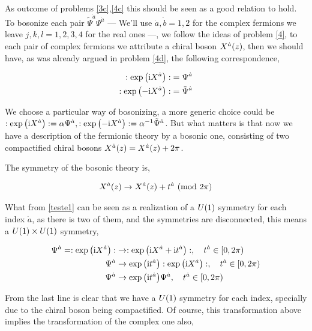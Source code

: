 As outcome of problems \ref{3c},\ref{4c} this should be seen as a good relation to hold. To bosonize each pair ${\tilde\Psi}^{\dot a}\Psi^{\dot a}$ --- We'll use $\dot a,\dot b=1,2$ for the complex fermions we 
leave $j,k,l=1,2,3,4$ for the real ones ---, 
we follow the ideas of problem \ref{4}, to each pair of complex fermions we attribute a chiral boson $X^{\dot a}\qty(z)$, then 
we should have, as was already argued in problem \ref{4d}, the following correspondence,

\begin{subequations}\label{teste1}
\begin{align}
    :\exp\qty(\textnormal{i} X^{\dot a}):&= \Psi^{\dot a}\\
    :\exp\qty(-\textnormal{i} X^{\dot a}):&= {\tilde\Psi}^{\dot a}
\end{align}
\end{subequations}

We choose a particular way of bosonizing, a more generic choice could be $:\exp\qty(\textnormal{i} X^{\dot a}):=\alpha \Psi^{\dot a},:\exp\qty(-\textnormal{i} X^{\dot a}):=\alpha^{-1} {\tilde\Psi}^{\dot a}$. 
But what matters is that now we have a description of the fermionic theory by a bosonic one, consisting of two compactified chiral bosons $X^{\dot a}\qty(z)=X^{\dot a}\qty(z)+2\pi$. 

\probitem{}

The symmetry of the bosonic theory is,

\begin{align*}
    X^{\dot a}\qty(z)\rightarrow X^{\dot a}\qty(z)+t^{\dot a}\ \qty(\textnormal{mod }2\pi)
\end{align*}

What from \ref{teste1} can be seen as a realization of a $U\qty(1)$ symmetry for each index $\dot a$, as there is 
two of them, and the symmetries are disconnected, this means a $U\qty(1)\times U\qty(1)$ symmetry,

\begin{align*}
    \Psi^{\dot a}=\cnord{\exp\qty(\im X^{\dot a})}&\rightarrow\cnord{\exp\qty(\im X^{\dot a}+\im t^{\dot a})},\ \ \ t^{\dot a}\in[0,2\pi)\\
    \Psi^{\dot a}&\rightarrow\exp\qty(\im t^{\dot a})\cnord{\exp\qty(\im X^{\dot a})},\ \ \ t^{\dot a}\in[0,2\pi)\\
    \Psi^{\dot a}&\rightarrow\exp\qty(\im t^{\dot a})\Psi^{\dot a},\ \ \ t^{\dot a}\in[0,2\pi)
\end{align*}

From the last line is clear that we have a $U\qty(1)$ symmetry for each index, specially due to the chiral boson being 
compactified. Of course, this transformation above implies the transformation of the complex one also,

